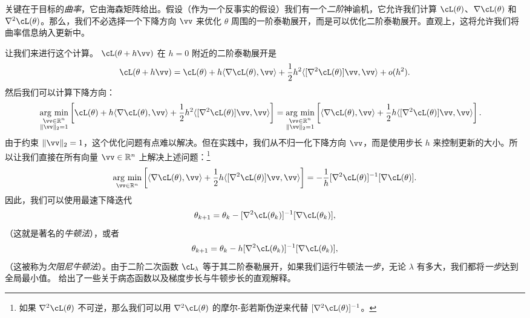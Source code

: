 \documentclass[../../book-main.tex]{subfiles}
\begin{document}
关键在于目标的\textit{曲率}，它由海森矩阵给出。假设（作为一个反事实的假设）我们有一个\textit{二阶}神谕机，它允许我们计算 \(\cL(\theta)\)、\(\nabla \cL(\theta)\) 和 \(\nabla^{2}\cL(\theta)\)。那么，我们不必选择一个下降方向 \(\vv\) 来优化 \(\theta\) 周围的一阶泰勒展开，而是可以优化二阶泰勒展开。直观上，这将允许我们将曲率信息纳入更新中。

让我们来进行这个计算。 \(\cL(\theta + h\vv)\) 在 \(h = 0\) 附近的二阶泰勒展开是
\begin{equation}
    \cL(\theta + h\vv) = \cL(\theta) + h\ip{\nabla \cL(\theta)}{\vv} + \frac{1}{2}h^{2}\ip{[\nabla^{2}\cL(\theta)]\vv}{\vv} + o(h^{2}).
\end{equation}
然后我们可以计算下降方向：
\begin{align}
    \argmin_{\substack{\vv \in \R^{n} \\ \norm{\vv}_{2} = 1}}\bs{\cL(\theta) + h\ip{\nabla \cL(\theta)}{\vv} + \frac{1}{2}h^{2}\ip{[\nabla^{2}\cL(\theta)]\vv}{\vv}} 
    &= \argmin_{\substack{\vv \in \R^{n} \\ \norm{\vv}_{2} = 1}}\bs{\ip{\nabla \cL(\theta)}{\vv} + \frac{1}{2}h\ip{[\nabla^{2}\cL(\theta)]\vv}{\vv}}.
\end{align}
由于约束 \(\norm{\vv}_{2} = 1\)，这个优化问题有点难以解决。但在实践中，我们从不归一化下降方向 \(\vv\)，而是使用步长 \(h\) 来控制更新的大小。所以让我们直接在所有向量 \(\vv \in \R^{n}\) 上解决上述问题：\footnote{如果 \(\nabla^{2}\cL(\theta)\) 不可逆，那么我们可以用 \(\nabla^{2}\cL(\theta)\) 的摩尔-彭若斯伪逆来代替 \([\nabla^{2}\cL(\theta)]^{-1}\)。}
\begin{equation}
    \argmin_{\vv \in \R^{n}}\bs{\ip{\nabla \cL(\theta)}{\vv} + \frac{1}{2}h\ip{[\nabla^{2}\cL(\theta)]\vv}{\vv}} = -\frac{1}{h}[\nabla^{2}\cL(\theta)]^{-1}[\nabla \cL(\theta)].
\end{equation}
因此，我们可以使用最速下降迭代
\begin{equation}
    \theta_{k + 1} = \theta_{k} - [\nabla^{2}\cL(\theta_{k})]^{-1}[\nabla \cL(\theta_{k})],
\end{equation}
（这就是著名的\textit{牛顿法}），或者
\begin{equation}
    \theta_{k + 1} = \theta_{k} - h[\nabla^{2}\cL(\theta_{k})]^{-1}[\nabla \cL(\theta_{k})],
\end{equation}
（这被称为\textit{欠阻尼牛顿法}）。由于二阶二次函数 \(\cL_{\lambda}\) 等于其二阶泰勒展开，如果我们运行牛顿法\textit{一步}，无论 \(\lambda\) 有多大，我们都将\textit{一步}达到全局最小值。 给出了一些关于病态函数以及梯度步长与牛顿步长的直观解释。
\end{document}
